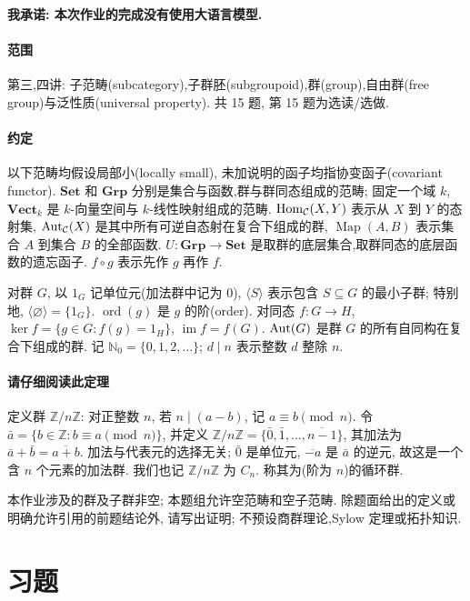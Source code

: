 \documentclass{article}
\begin{document}
\textbf{我承诺: 本次作业的完成没有使用大语言模型.}

\paragraph{范围} 第三,四讲: 子范畴(subcategory),子群胚(subgroupoid),群(group),自由群(free group)与泛性质(universal property). 共 15 题, 第 15 题为选读/选做.

\paragraph{约定} 以下范畴均假设局部小(locally small), 未加说明的函子均指协变函子(covariant functor). $\mathbf{Set}$ 和 $\mathbf{Grp}$ 分别是集合与函数,群与群同态组成的范畴; 固定一个域 $k$, $\mathbf{Vect}_k$ 是 $k$-向量空间与 $k$-线性映射组成的范畴. $\operatorname{Hom}_{\mathcal C}(X,Y)$ 表示从 $X$ 到 $Y$ 的态射集, $\operatorname{Aut}_{\mathcal C}(X)$ 是其中所有可逆自态射在复合下组成的群, $\operatorname{Map}(A,B)$ 表示集合 $A$ 到集合 $B$ 的全部函数. $U:\mathbf{Grp}\to\mathbf{Set}$ 是取群的底层集合,取群同态的底层函数的遗忘函子. $f\circ g$ 表示先作 $g$ 再作 $f$.

对群 $G$, 以 $1_G$ 记单位元(加法群中记为 $0$), $\langle S\rangle$ 表示包含 $S\subseteq G$ 的最小子群; 特别地, $\langle\varnothing\rangle=\{1_G\}$. $\operatorname{ord}(g)$ 是 $g$ 的阶(order). 对同态 $f:G\to H$, $\ker f=\{g\in G:f(g)=1_H\}$, $\operatorname{im}f=f(G)$. $\operatorname{Aut}(G)$ 是群 $G$ 的所有自同构在复合下组成的群. 记 $\mathbb N_0=\{0,1,2,\ldots\}$; $d\mid n$ 表示整数 $d$ 整除 $n$.

\paragraph{请仔细阅读此定理} 定义群 $\mathbb Z/n\mathbb Z$: 对正整数 $n$, 若 $n\mid(a-b)$, 记 $a\equiv b\pmod n$. 令 $\bar a=\{b\in\mathbb Z:b\equiv a\pmod n\}$, 并定义 $\mathbb Z/n\mathbb Z=\{\bar 0,\bar 1,\ldots,\overline{n-1}\}$, 其加法为 $\bar a+\bar b=\overline{a+b}$. 加法与代表元的选择无关; $\bar 0$ 是单位元, $\overline{-a}$ 是 $\bar a$ 的逆元, 故这是一个含 $n$ 个元素的加法群. 我们也记 $\mathbb Z/n\mathbb Z$ 为 $C_n$. 称其为(阶为 $n$)的循环群.

本作业涉及的群及子群非空; 本题组允许空范畴和空子范畴. 除题面给出的定义或明确允许引用的前题结论外, 请写出证明; 不预设商群理论,Sylow 定理或拓扑知识.

\section*{习题}
\end{document}
